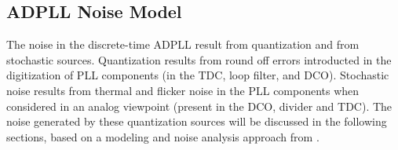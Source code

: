 
\subsection{ADPLL Noise Model} \label{pn_theory}
The noise in the discrete-time ADPLL result from quantization and from stochastic sources. Quantization results from round off errors introducted in the digitization of PLL components (in the TDC, loop filter, and DCO). Stochastic noise results from thermal and flicker noise in the PLL components when considered in an analog viewpoint (present in the DCO, divider and TDC). The noise generated by these quantization sources will be discussed in the following sections, based on a modeling and noise analysis approach from \cite{perrott_2002}.

